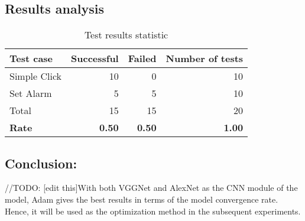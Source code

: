 \subsection{Results analysis}
\begin{table}[H]
	\centering
	\caption{Test results statistic}	
	\label{tab:result_stat}
	\begin{tabularx}{0.65\textwidth}{l|rrr}
		\hline
		Test case & Successful & Failed & Number of tests \\
		\hline
		Simple Click & 10 & 0 & 10 \\
		Set Alarm & 5 & 5 & 10 \\
		\hline
		Total & 15 & 15 & 20 \\
		\hline
		\textbf{Rate} & \textbf{0.50} & \textbf{0.50} & \textbf{1.00} \\
		\hline
	\end{tabularx}
\end{table}

\subsection{Conclusion:} //TODO: [edit this]With both VGGNet and AlexNet as the CNN module of the model, Adam gives the best results in terms of the model convergence rate. Hence, it will be used as the optimization method in the subsequent experiments.
